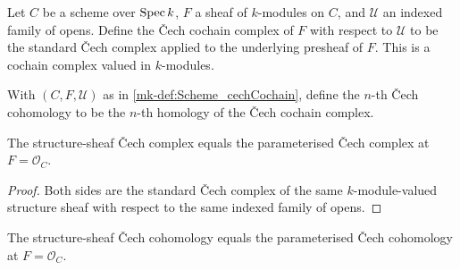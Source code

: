 \begin{definition}\label{mk-def:Scheme_cechCochain}
  \leanok


  Let \(C\) be a scheme over \(\operatorname{Spec} k\), \(F\) a sheaf of \(k\)-modules on \(C\), and \(\mathcal U\) an indexed family of opens. Define the \v{C}ech cochain complex of \(F\) with respect to \(\mathcal U\) to be the standard \v{C}ech complex applied to the underlying presheaf of \(F\). This is a cochain complex valued in \(k\)-modules.
\end{definition}

\begin{definition}\label{mk-def:Scheme_cechCohomology}
  \leanok

  With \((C, F, \mathcal U)\) as in \ref{mk-def:Scheme_cechCochain}, define the \(n\)-th \v{C}ech cohomology to be the \(n\)-th homology of the \v{C}ech cochain complex.
\end{definition}

\begin{theorem}\label{mk-thm:Scheme_cechCochain_OC_eq}
  \leanok

  The structure-sheaf \v{C}ech complex equals the parameterised \v{C}ech complex at \(F = \mathcal O_C\).
\end{theorem}

\begin{proof}
  \leanok
  Both sides are the standard \v{C}ech complex of the same \(k\)-module-valued structure sheaf with respect to the same indexed family of opens.
\end{proof}

\begin{theorem}\label{mk-thm:Scheme_cechCohomology_OC_eq}
  \leanok

  The structure-sheaf \v{C}ech cohomology equals the parameterised \v{C}ech cohomology at \(F = \mathcal O_C\).
\end{theorem}

